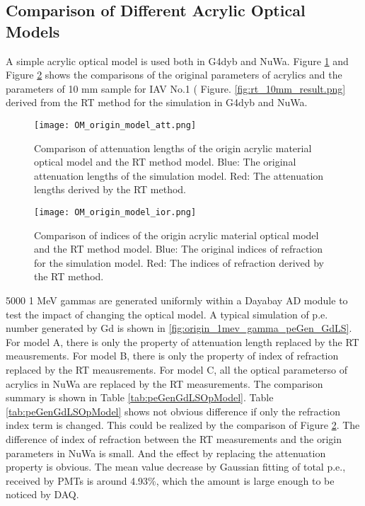 \subsection{Comparison of Different Acrylic Optical Models}

A simple acrylic optical model is used both in G4dyb and NuWa. Figure \ref{fig:OM_origin_model_att.png} and
Figure \ref{fig:OM_origin_model_ior.png} shows the comparisons of the original parameters of acrylics
and the parameters of 10 mm sample for IAV No.1 ( Figure. \ref{fig:rt_10mm_result.png} derived from the RT method for the simulation in G4dyb and NuWa.


\begin{figure}
    \centering
    \texttt{[image: OM\_origin\_model\_att.png]}
    \caption[Comparison of attenuation length of the origin acrylic material optical model and the RT method model]
{
Comparison of attenuation lengths of the origin acrylic material optical model and the RT method model.
Blue: The original attenuation lengths of the simulation model.
Red: The attenuation lengths derived by the RT method.
}
    \label{fig:OM_origin_model_att.png}
    \end{figure}

\begin{figure}
    \centering
    \texttt{[image: OM\_origin\_model\_ior.png]}
    \caption[Comparison of indices of the origin acrylic material optical model and the RT method model]
{
Comparison of indices of the origin acrylic material optical model and the RT method model.
Blue: The original indices of refraction for the simulation model.
Red: The indices of refraction derived by the RT method.
}
    \label{fig:OM_origin_model_ior.png}
    \end{figure}


5000 1 MeV gammas are generated uniformly within a Dayabay AD module to test the impact of changing the optical model.
A typical simulation of p.e. number generated by Gd is shown in \ref{fig:origin_1mev_gamma_peGen_GdLS}.
For model A, there is only the property of attenuation length replaced by the RT meausrements.
For model B, there is only the property of index of refraction replaced by the RT meausrements.
For model C, all the optical parameterso of acrylics in NuWa are replaced by the RT measurements.
The comparison summary is shown in Table \ref{tab:peGenGdLSOpModel}.
Table \ref{tab:peGenGdLSOpModel} shows not obvious difference if only the refraction index term is changed.
This could be realized by the comparison of Figure \ref{fig:OM_origin_model_ior.png}. The difference of index of
refraction between the RT measurements and the origin parameters in NuWa is small.
And the effect by replacing the attenuation property is obvious. The mean value decrease by Gaussian fitting of total p.e., received by PMTs
is around 4.93\%, which the amount is large enough to be noticed by DAQ.


